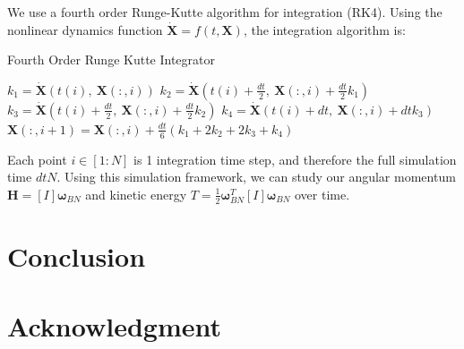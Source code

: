 \documentclass[paper]{aiaaNew}
\begin{document}
We use a fourth order Runge-Kutte algorithm for integration (RK4). Using the nonlinear dynamics function $\dot{\bm{X}} = f(t,\bm{X})$, the integration algorithm is:



\begin{algorithm}
\caption{Fourth Order Runge Kutte Integrator}\label{RK4}
\begin{algorithmic}[1]
    \State $ k_1 = \dot{\bm{X}}(t(i), \ \bm{X}(:,i))$
    \State $ k_2 = \dot{\bm{X}}(t(i)+ \frac{dt}{2}, \  \bm{X}(:,i)+ \frac{dt}{2} k_1)$
    \State $ k_3 = \dot{\bm{X}}(t(i)+ \frac{dt}{2}, \ \bm{X}(:,i)+ \frac{dt}{2} k_2)$
    \State $ k_4 = \dot{\bm{X}}(t(i)+dt,  \ \bm{X}(:,i) + dt k_3)$
    \State $ \bm{X}(:,i+1) =  \bm{X}(:,i) + \frac{dt}{6}(k_1+2k_2+2k_3+k_4)$
\EndFor
\end{algorithmic}
\end{algorithm}

Each point $i \in [1:N]$ is 1 integration time step, and therefore the full simulation time $dtN$. Using this simulation framework, we can study our angular momentum $\bm{H} = [I]\bm{\omega}_{BN}$ and kinetic energy $T = \frac{1}{2} \bm{\omega}_{BN}^T [I] \bm{\omega}_{BN}$ over time.








\section{Conclusion}

\section*{Acknowledgment}

\end{document}
